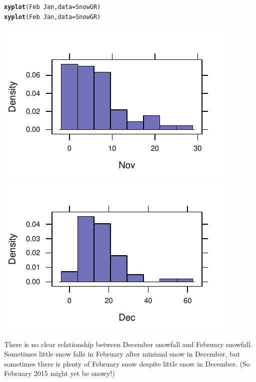 \documentclass[twoside]{book}\usepackage[]{graphicx}\usepackage[]{xcolor}
\makeatletter
\def\maxwidth{ %
  \ifdim\Gin@nat@width>\linewidth
    \linewidth
  \else
    \Gin@nat@width
  \fi
}
\newcommand{\hlopt}[1]{\textcolor[rgb]{0,0,0}{#1}}%
\newcommand{\hlstd}[1]{\textcolor[rgb]{0.345,0.345,0.345}{#1}}%
\newcommand{\hlkwc}[1]{\textcolor[rgb]{0.333,0.667,0.333}{#1}}%
\newcommand{\hlkwd}[1]{\textcolor[rgb]{0.737,0.353,0.396}{\textbf{#1}}}%
\newenvironment{kframe}{%
 \def\at@end@of@kframe{}%
 \ifinner\ifhmode%
  \def\at@end@of@kframe{\end{minipage}}%
  \begin{minipage}{\columnwidth}%
 \fi\fi%
 \def\FrameCommand##1{\hskip\@totalleftmargin \hskip-\fboxsep
 \colorbox{shadecolor}{##1}\hskip-\fboxsep
     \hskip-\linewidth \hskip-\@totalleftmargin \hskip\columnwidth}%
 \MakeFramed {\advance\hsize-\width
   \@totalleftmargin\z@ \linewidth\hsize
   \@setminipage}}%
 {\par\unskip\endMakeFramed%
 \at@end@of@kframe}
\newenvironment{knitrout}{}{} %
\makeatother
\begin{document}
\begin{solution}
\begin{knitrout}
\color{fgcolor}\begin{kframe}
\begin{alltt}
\hlkwd{xyplot}\hlstd{(Feb} \hlopt{~} \hlstd{Jan,} \hlkwc{data}\hlstd{=SnowGR)}
\hlkwd{xyplot}\hlstd{(Feb} \hlopt{~} \hlstd{Jan,} \hlkwc{data}\hlstd{=SnowGR)}
\end{alltt}
\end{kframe}

{\centering \includegraphics[width=\maxwidth]{figures/fig-unnamed-chunk-38-1} 
\includegraphics[width=\maxwidth]{figures/fig-unnamed-chunk-38-2} 

}



\end{knitrout}
There is no clear relationship between December snowfall and February snowfall.  
Sometimes little snow falls in February after minimal snow in December, but sometimes
there is plenty of February snow despite little snow in December.  (So February 2015 might
yet be snowy!)
\end{solution}
\shipoutProblems
\end{document}

